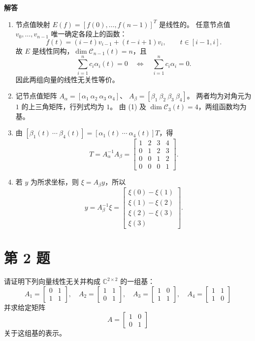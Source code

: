 \documentclass[UTF8,10pt,letterpaper,fontset=fandol]{ctexart}
\newcommand{\C}{\mathbb C}
\newcommand{\Solution}{\par\Needspace{5\baselineskip}\textbf{解答}\par}
\begin{document}
\Solution
\begin{enumerate}
\item 节点值映射 \(E(f)=[f(0),\ldots,f(n-1)]^T\) 是线性的。
任意节点值 \(v_0,\ldots,v_{n-1}\) 唯一确定各段上的函数：
\[
f(t)=(i-t)v_{i-1}+(t-i+1)v_i,\qquad t\in[i-1,i].
\]
故 \(E\) 是线性同构，\(\dim\mathcal C_{n-1}(t)=n\)，且
\[
\sum_{i=1}^n c_i\alpha_i(t)=0
\quad\Longleftrightarrow\quad
\sum_{i=1}^n c_i\alpha_i=0.
\]
因此两组向量的线性无关性等价。
\item 记节点值矩阵 \(A_\alpha=[\alpha_1\ \alpha_2\ \alpha_3\ \alpha_4]\)、
\(A_\beta=[\beta_1\ \beta_2\ \beta_3\ \beta_4]\)。
两者均为对角元为 \(1\) 的上三角矩阵，行列式均为 \(1\)。
由 (1) 及 \(\dim\mathcal C_3(t)=4\)，两组函数均为基。
\item 由 \([\beta_1(t)\ \cdots\ \beta_4(t)]
=[\alpha_1(t)\ \cdots\ \alpha_4(t)]T\)，得
\[
\boxed{T=A_\alpha^{-1}A_\beta=
\begin{bmatrix}
1&2&3&4\\
0&1&2&3\\
0&0&1&2\\
0&0&0&1
\end{bmatrix}}.
\]
\item 若 \(y\) 为所求坐标，则 \(\xi=A_\beta y\)，所以
\[
\boxed{y=A_\beta^{-1}\xi=
\begin{bmatrix}
\xi(0)-\xi(1)\\
\xi(1)-\xi(2)\\
\xi(2)-\xi(3)\\
\xi(3)
\end{bmatrix}}.
\]
\end{enumerate}

\section{第 2 题}
请证明下列向量线性无关并构成 \(\C^{2\times2}\) 的一组基：
\[
A_1=\begin{bmatrix}0&1\\1&1\end{bmatrix},\quad
A_2=\begin{bmatrix}1&1\\0&1\end{bmatrix},\quad
A_3=\begin{bmatrix}1&0\\1&1\end{bmatrix},\quad
A_4=\begin{bmatrix}1&1\\1&0\end{bmatrix}
\]
并求给定矩阵
\[
A=\begin{bmatrix}1&0\\0&1\end{bmatrix}
\]
关于这组基的表示。
\end{document}
